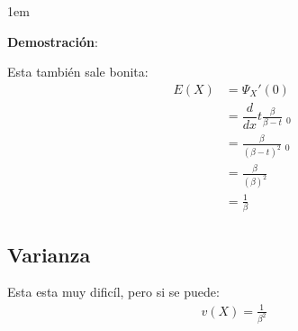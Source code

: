 \documentclass[12pt, fleqn]{report}                             %
\newenvironment{SmallIndentation}[1][0.75em]                    %
        {\begin{adjustwidth}{#1}{}\begin{footnotesize}}             %
        {\end{footnotesize}\end{adjustwidth}}                       %
\theoremstyle{break}                                            %
\newcommand \MiniDerivate[1][x]   {\dfrac{d}{d #1}}             %
\DeclareMathOperator \Evaluate  {\Big|}                         %
\begin{document}
                \begin{SmallIndentation}[1em]
                    \textbf{Demostración}:
                    
                    Esta también sale bonita:
                    \begin{align*}
                        E(X)
                            &= \Psi_X' (0)                                              \\
                            &= \MiniDerivate{t} \frac{\beta}{\beta - t} \Evaluate_0     \\
                            &= \frac{\beta}{(\beta - t)^2} \Evaluate_0                  \\
                            &= \frac{\beta}{(\beta)^2}                                  \\
                            &= \frac{1}{\beta}
                    \end{align*}
                    
                \end{SmallIndentation}

            \vspace{1em}
            \subsection{Varianza}

                Esta esta muy dificíl, pero si se puede:
                \begin{align*}
                    v(X) = \frac{1}{\beta^2}
                \end{align*}
\end{document}
